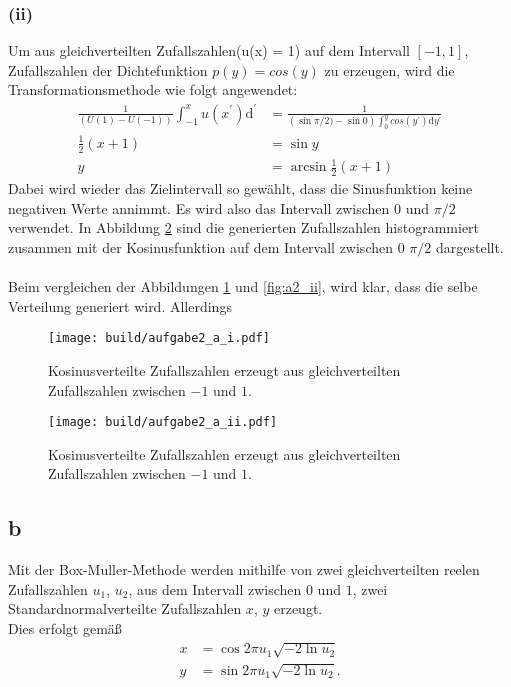 \subsubsection*{(ii)}
Um aus gleichverteilten Zufallszahlen(u(x) = 1) auf dem Intervall $[-1,1]$, Zufallszahlen
der Dichtefunktion $p(y) = cos(y)$ zu erzeugen, wird die Transformationsmethode
wie folgt angewendet:
\begin{align*}
  \frac{1}{\left(U(1) - U(-1)\right)} \int_{-1}^{x} u(x^\prime) \mathrm{d}^\prime &= \frac{1}{\left( \sin \pi /2) - \sin 0 \right) \int_{0}^{y} cos(y^\prime) \mathrm{d}y^\prime}\\
  \frac{1}{2} \left( x + 1 \right) &= \sin y \\
  y &= \arcsin \frac{1}{2} \left( x + 1 \right)
\end{align*}
Dabei wird wieder das Zielintervall so gewählt, dass die Sinusfunktion keine negativen Werte annimmt. Es wird also das Intervall
zwischen $0$ und $\pi / 2$ verwendet.
In Abbildung \ref{fig:a2_a_ii} sind die generierten Zufallszahlen histogrammiert zusammen mit der Kosinusfunktion auf dem Intervall zwischen $0$ $\pi / 2$ dargestellt. \\ \\
Beim vergleichen der Abbildungen \ref{fig:a2_a_i} und \ref{fig:a2_ii}, wird klar, dass die selbe Verteilung generiert wird.
Allerdings

\begin{figure}[h]
  \centering
  \texttt{[image: build/aufgabe2\_a\_i.pdf]}
  \caption{Kosinusverteilte Zufallszahlen erzeugt aus gleichverteilten Zufallszahlen zwischen $-1$ und $1$.}
  \label{fig:a2_a_i}
\end{figure}

\begin{figure}[h]
  \centering
  \texttt{[image: build/aufgabe2\_a\_ii.pdf]}
  \caption{Kosinusverteilte Zufallszahlen erzeugt aus gleichverteilten Zufallszahlen zwischen $-1$ und $1$.}
  \label{fig:a2_a_ii}
\end{figure}


\subsection*{b}
Mit der Box-Muller-Methode werden mithilfe von zwei gleichverteilten reelen Zufallszahlen $u_1$, $u_2$, aus dem Intervall zwischen
$0$ und $1$, zwei Standardnormalverteilte Zufallszahlen $x$, $y$ erzeugt. \\
Dies erfolgt gemäß
\begin{align*}
  x &= \cos 2\pi u_1 \sqrt{-2 \ln u_2} \\
  y &= \sin 2\pi u_1 \sqrt{-2 \ln u_2} .
\end{align*}

